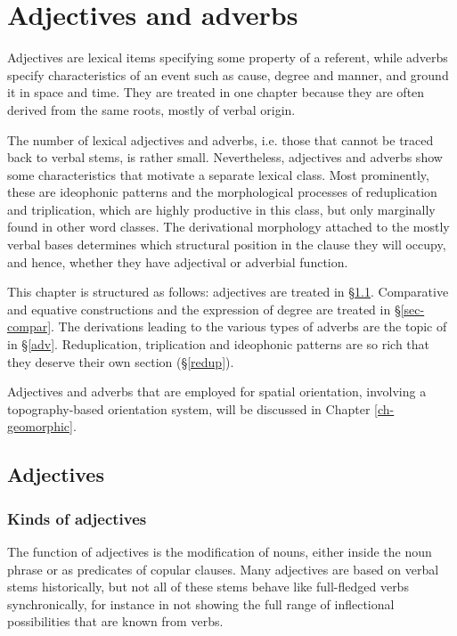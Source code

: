 ﻿
\chapter{Adjectives and adverbs} \label{adj-adv}

Adjectives are lexical items specifying some property of a referent, while adverbs specify characteristics of an event such as cause, degree and manner, and ground it in space and time. They are treated in one chapter because they are often derived from the same roots, mostly of verbal origin.  

The number of lexical adjectives and adverbs, i.e. those that cannot be traced back to verbal stems, is rather small. Nevertheless, adjectives and adverbs show some characteristics that motivate a separate lexical class. Most prominently, these are ideophonic patterns and the morphological processes of reduplication and triplication, which are highly  productive in this class, but only marginally found in other word classes. The derivational morphology attached to the mostly verbal bases determines which structural position in the clause they will occupy, and hence, whether they have adjectival or adverbial function. 

This chapter is structured as follows:  adjectives are treated in §\ref{adj}. Comparative and equative constructions and the expression of degree are treated in §\ref{sec-compar}.  The  derivations leading to the various types of adverbs are the topic of in §\ref{adv}. Reduplication, triplication and ideophonic patterns are so rich that they deserve their own section (§\ref{redup}). 

Adjectives and adverbs that are employed for  spatial orientation, involving a topography-based  orientation system, will be discussed in Chapter \ref{ch-geomorphic}. 

\section{Adjectives}\label{adj}

\subsection{Kinds of adjectives}\label{adj-kinds}

The function of adjectives is the modification of nouns, either inside the noun phrase or as predicates of copular clauses. Many adjectives are based on verbal stems historically, but not all of these stems behave like full-fledged verbs synchronically, for  instance in not showing the full range of inflectional possibilities that are known from verbs. 


